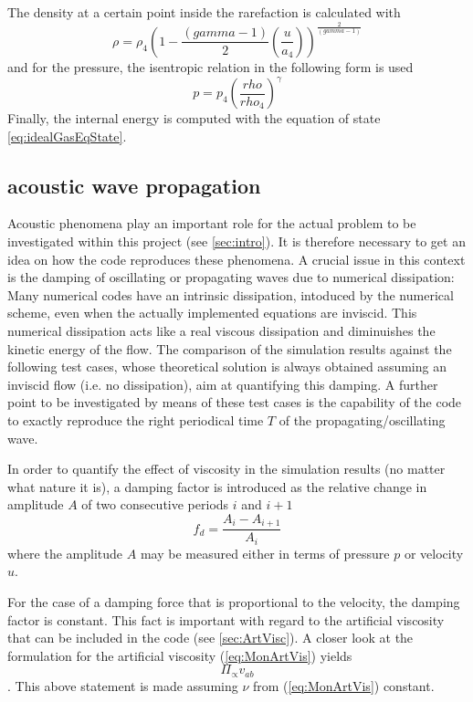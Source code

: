 \documentclass{report}
\begin{document}
The density at a certain point inside the rarefaction is calculated with
\begin{equation}
\rho=\rho_4 (1-\frac{(gamma-1)}{2}(\frac{u}{a_4}))^\frac{2}{(gamma-1)}
\end{equation}
and for the pressure, the isentropic relation in the following form is used
\begin{equation}
p=p_4(\frac{rho}{rho_4})^\gamma
\end{equation}
Finally, the internal energy is computed with the equation of state \ref{eq:idealGasEqState}.

\subsection{acoustic wave propagation}
Acoustic phenomena play an important role for the actual problem to be investigated within this project (see \ref{sec:intro}). It is therefore necessary to get an idea on how the code reproduces these phenomena. A crucial issue in this context is the damping of oscillating or propagating waves due to numerical dissipation: Many numerical codes have an intrinsic dissipation, intoduced by the numerical scheme, even when the actually implemented equations are inviscid. This numerical dissipation acts like a real viscous dissipation and diminuishes the kinetic energy of the flow. The comparison of the simulation results against the following test cases, whose theoretical solution is always obtained assuming an inviscid flow (i.e. no dissipation), aim at quantifying this damping. A further point to be investigated by means of these test cases is the capability of the code to exactly reproduce the right periodical time $T$ of the propagating/oscillating wave.

In order to quantify the effect of viscosity in the simulation results (no matter what nature it is), a damping factor
is introduced as the relative change in amplitude $A$ of two consecutive periods $i$ and $i+1$
\begin{equation}
 f_d=\frac{A_i-A_{i+1}}{A_i}
\end{equation}
where the amplitude $A$ may be measured either in terms of pressure $p$ or velocity $u$.

For the case of a damping force that is proportional to the velocity, the damping factor
is constant. This fact is important with regard to the artificial viscosity that can be included in the code (see \ref{sec:ArtVisc}). A closer look at the formulation for the artificial viscosity (\ref{eq:MonArtVis}) yields
\begin{equation}
 \Pi_\propto v_{ab}
\end{equation}.
This above statement is made assuming $\nu$ from (\ref{eq:MonArtVis}) constant.
\end{document}
